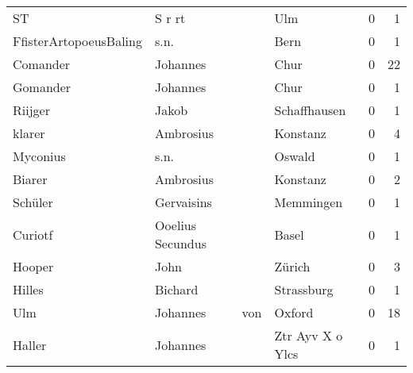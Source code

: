 \begin{tabular}{llllrr}
                       ST &                             S r rt &             &                                         Ulm &          0 &         1 \\
   FfisterArtopoeusBaling &                               s.n. &             &                                        Bern &          0 &         1 \\
                 Comander &                           Johannes &             &                                        Chur &          0 &        22 \\
                 Gomander &                           Johannes &             &                                        Chur &          0 &         1 \\
                  Riijger &                              Jakob &             &                                Schaffhausen &          0 &         1 \\
                   klarer &                          Ambrosius &             &                                    Konstanz &          0 &         4 \\
                 Myconius &                               s.n. &             &                                      Oswald &          0 &         1 \\
                   Biarer &                          Ambrosius &             &                                    Konstanz &          0 &         2 \\
                  Schüler &                         Gervaisins &             &                                   Memmingen &          0 &         1 \\
                  Curiotf &                   Ooelius Secundus &             &                                       Basel &          0 &         1 \\
                   Hooper &                               John &             &                                      Zürich &          0 &         3 \\
                   Hilles &                            Bichard &             &                                  Strassburg &          0 &         1 \\
                      Ulm &                           Johannes &         von &                                      Oxford &          0 &        18 \\
                   Haller &                           Johannes &             &                            Ztr Ayv X o Ylcs &          0 &         1 \\

\end{tabular}
